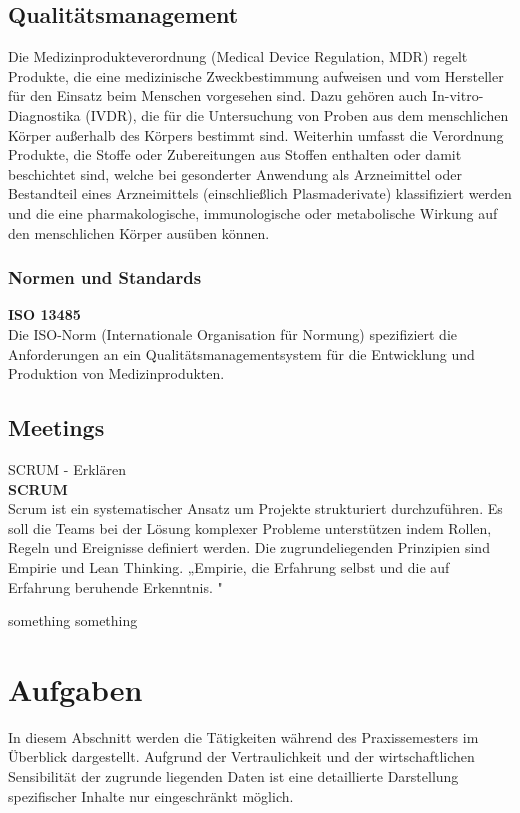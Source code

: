 \documentclass[a4paper, 12pt]{article}
\begin{document}
\newpage
\subsection{Qualitätsmanagement}\label{Qualitätsmanagement}
Die Medizinprodukteverordnung (Medical Device Regulation, MDR) regelt Produkte, die eine medizinische Zweckbestimmung aufweisen und vom Hersteller für den Einsatz beim Menschen vorgesehen sind. Dazu gehören auch In-vitro-Diagnostika (IVDR), die für die Untersuchung von Proben aus dem menschlichen Körper außerhalb des Körpers bestimmt sind. Weiterhin umfasst die Verordnung Produkte, die Stoffe oder Zubereitungen aus Stoffen enthalten oder damit beschichtet sind, welche bei gesonderter Anwendung als Arzneimittel oder Bestandteil eines Arzneimittels (einschließlich Plasmaderivate) klassifiziert werden und die eine pharmakologische, immunologische oder metabolische Wirkung auf den menschlichen Körper ausüben können. \cite{gesund_minist}

\subsubsection{Normen und Standards}
{\bfseries ISO 13485}\\
Die ISO-Norm (Internationale Organisation für Normung) spezifiziert die Anforderungen an ein Qualitätsmanagementsystem für die Entwicklung und Produktion von Medizinprodukten.


\subsection{Meetings}\label{Meetings}
SCRUM - Erklären
\\ 
\textbf{SCRUM}\\
Scrum ist ein systematischer Ansatz um Projekte strukturiert durchzuführen. Es soll die Teams bei der Lösung komplexer Probleme unterstützen indem Rollen, Regeln und Ereignisse definiert werden. Die zugrundeliegenden Prinzipien sind Empirie und Lean Thinking. 
„Empirie, die Erfahrung selbst und die auf Erfahrung beruhende Erkenntnis.  
 \cite{dorsch_empirie}" 

something something 
\cite{scrum2020}

\newpage
\section{Aufgaben}\label{Aufgaben}
In diesem Abschnitt werden die Tätigkeiten während des Praxissemesters im Überblick dargestellt. Aufgrund der Vertraulichkeit und der wirtschaftlichen Sensibilität der zugrunde liegenden Daten ist eine detaillierte Darstellung spezifischer Inhalte nur eingeschränkt möglich.
\end{document}
